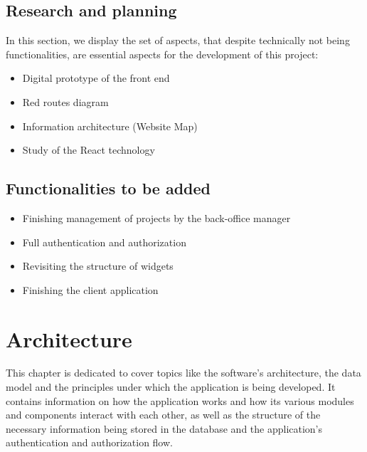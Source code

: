 \documentclass[a4paper,twoside,10pt]{report}
\begin{document}
\newpage
\section{Research and planning}
In this section, we display the set of aspects, that despite technically not being functionalities, are essential aspects for the development of this project:
\\ \newline
\begin{itemize}
    \item Digital prototype of the front end
    \item Red routes diagram
    \item Information architecture (Website Map)
    \item Study of the React technology
\end{itemize}

\section{Functionalities to be added}
\begin{itemize}
    \item Finishing management of projects by the back-office manager
    \item Full authentication and authorization
    \item Revisiting the structure of widgets
    \item Finishing the client application
\end{itemize}

\chapter{Architecture}
This chapter is dedicated to cover topics like the software's architecture, the data model and the principles under which the application is being developed. 
\newline
It contains information on how the application works and how its various modules and components interact with each other, as well as the structure of the necessary information being stored in the database and the application's authentication and authorization flow.
\end{document}

